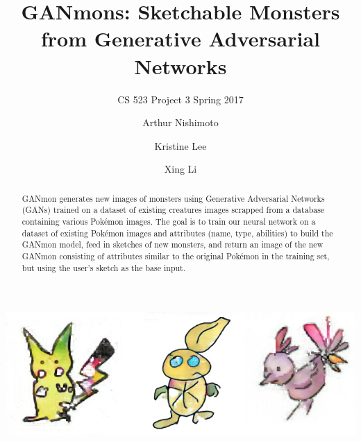 \documentclass[sigchi]{acmart}
\begin{document}
\title{GANmons: Sketchable Monsters from Generative Adversarial Networks}
\subtitle{CS 523 Project 3 Spring 2017}


\author{Arthur Nishimoto}

\author{Kristine Lee}

\author{Xing Li}


\begin{abstract}
GANmon generates new images of monsters using Generative Adversarial Networks (GANs) trained on a dataset of existing creatures images scrapped from a database containing various Pokémon images. The goal is to train our neural network on a dataset of existing Pokémon images and attributes (name, type, abilities) to build the GANmon model, feed in sketches of new monsters, and return an image of the new GANmon consisting of attributes similar to the original Pokémon in the training set, but using the user’s sketch as the base input.
\end{abstract}


\begin{teaserfigure}
   \includegraphics[width=6.8in]{figures/6A}
   \label{fig:teaser}
\end{teaserfigure}
\end{document}
